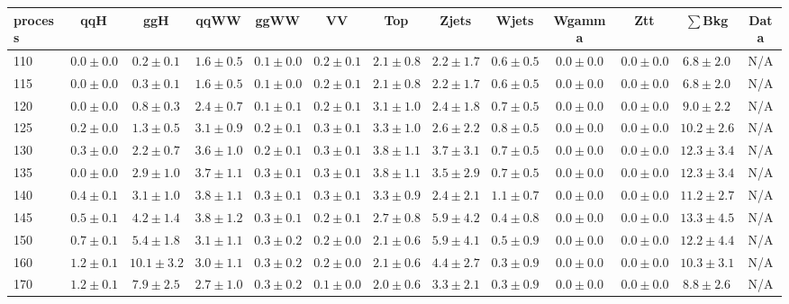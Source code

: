 \begin{table}
{%
 \tiny
 \begin{center}
 \begin{tabular}{l | c c | c c c c c c c c  | c c}
 \hline
 process & qqH & ggH & qqWW & ggWW & VV & Top & Zjets & Wjets & Wgamma & Ztt & $\sum$Bkg & Data \\
 \hline
110 & $0.0\pm0.0$ & $0.2\pm0.1$ & $1.6\pm0.5$ & $0.1\pm0.0$ & $0.2\pm0.1$ & $2.1\pm0.8$ & $2.2\pm1.7$ & $0.6\pm0.5$ & $0.0\pm0.0$ & $0.0\pm0.0$ & $6.8\pm2.0$ & N/A \\
115 & $0.0\pm0.0$ & $0.3\pm0.1$ & $1.6\pm0.5$ & $0.1\pm0.0$ & $0.2\pm0.1$ & $2.1\pm0.8$ & $2.2\pm1.7$ & $0.6\pm0.5$ & $0.0\pm0.0$ & $0.0\pm0.0$ & $6.8\pm2.0$ & N/A \\
120 & $0.0\pm0.0$ & $0.8\pm0.3$ & $2.4\pm0.7$ & $0.1\pm0.1$ & $0.2\pm0.1$ & $3.1\pm1.0$ & $2.4\pm1.8$ & $0.7\pm0.5$ & $0.0\pm0.0$ & $0.0\pm0.0$ & $9.0\pm2.2$ & N/A \\
125 & $0.2\pm0.0$ & $1.3\pm0.5$ & $3.1\pm0.9$ & $0.2\pm0.1$ & $0.3\pm0.1$ & $3.3\pm1.0$ & $2.6\pm2.2$ & $0.8\pm0.5$ & $0.0\pm0.0$ & $0.0\pm0.0$ & $10.2\pm2.6$ & N/A \\
130 & $0.3\pm0.0$ & $2.2\pm0.7$ & $3.6\pm1.0$ & $0.2\pm0.1$ & $0.3\pm0.1$ & $3.8\pm1.1$ & $3.7\pm3.1$ & $0.7\pm0.5$ & $0.0\pm0.0$ & $0.0\pm0.0$ & $12.3\pm3.4$ & N/A \\
135 & $0.0\pm0.0$ & $2.9\pm1.0$ & $3.7\pm1.1$ & $0.3\pm0.1$ & $0.3\pm0.1$ & $3.8\pm1.1$ & $3.5\pm2.9$ & $0.7\pm0.5$ & $0.0\pm0.0$ & $0.0\pm0.0$ & $12.3\pm3.4$ & N/A \\
140 & $0.4\pm0.1$ & $3.1\pm1.0$ & $3.8\pm1.1$ & $0.3\pm0.1$ & $0.3\pm0.1$ & $3.3\pm0.9$ & $2.4\pm2.1$ & $1.1\pm0.7$ & $0.0\pm0.0$ & $0.0\pm0.0$ & $11.2\pm2.7$ & N/A \\
145 & $0.5\pm0.1$ & $4.2\pm1.4$ & $3.8\pm1.2$ & $0.3\pm0.1$ & $0.2\pm0.1$ & $2.7\pm0.8$ & $5.9\pm4.2$ & $0.4\pm0.8$ & $0.0\pm0.0$ & $0.0\pm0.0$ & $13.3\pm4.5$ & N/A \\
150 & $0.7\pm0.1$ & $5.4\pm1.8$ & $3.1\pm1.1$ & $0.3\pm0.2$ & $0.2\pm0.0$ & $2.1\pm0.6$ & $5.9\pm4.1$ & $0.5\pm0.9$ & $0.0\pm0.0$ & $0.0\pm0.0$ & $12.2\pm4.4$ & N/A \\
160 & $1.2\pm0.1$ & $10.1\pm3.2$ & $3.0\pm1.1$ & $0.3\pm0.2$ & $0.2\pm0.0$ & $2.1\pm0.6$ & $4.4\pm2.7$ & $0.3\pm0.9$ & $0.0\pm0.0$ & $0.0\pm0.0$ & $10.3\pm3.1$ & N/A \\
170 & $1.2\pm0.1$ & $7.9\pm2.5$ & $2.7\pm1.0$ & $0.3\pm0.2$ & $0.1\pm0.0$ & $2.0\pm0.6$ & $3.3\pm2.1$ & $0.3\pm0.9$ & $0.0\pm0.0$ & $0.0\pm0.0$ & $8.8\pm2.6$ & N/A \\

\end{tabular}
\end{center}}
\end{table}
